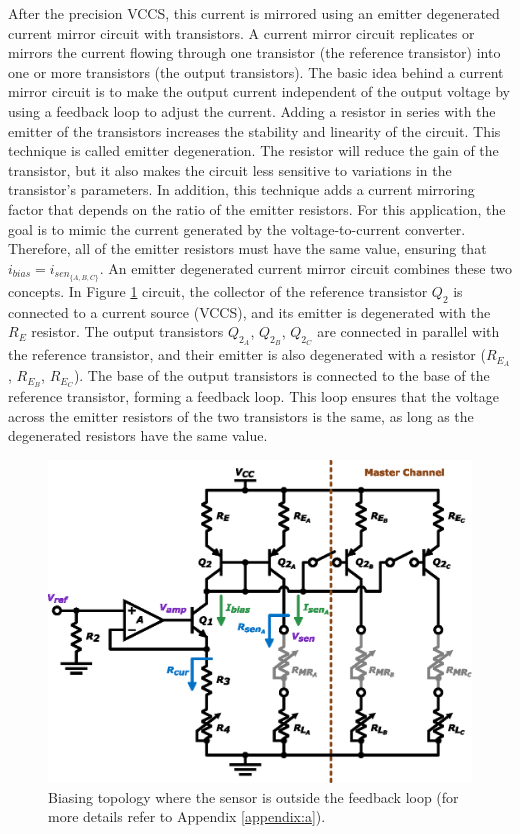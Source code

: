 After the precision \ac{VCCS}, this current is mirrored using an emitter degenerated current mirror circuit with transistors. A current mirror circuit replicates or mirrors the current flowing through one transistor (the reference transistor) into one or more transistors (the output transistors). The basic idea behind a current mirror circuit is to make the output current independent of the output voltage by using a feedback loop to adjust the current. Adding a resistor in series with the emitter of the transistors increases the stability and linearity of the circuit. This technique is called emitter degeneration. The resistor will reduce the gain of the transistor, but it also makes the circuit less sensitive to variations in the transistor's parameters. In addition, this technique adds a current mirroring factor that depends on the ratio of the emitter resistors. For this application, the goal is to mimic the current generated by the voltage-to-current converter. Therefore, all of the emitter resistors must have the same value, ensuring that $i_{bias} = i_{sen_{\{A, B, C\}}}$. An emitter degenerated current mirror circuit combines these two concepts. In Figure \ref{figure:bias-openloop} circuit, the collector of the reference transistor $Q_2$ is connected to a current source (\ac{VCCS}), and its emitter is degenerated with the $R_E$ resistor. The output transistors $Q_{2_{A}}$, $Q_{2_{B}}$, $Q_{2_{C}}$ are connected in parallel with the reference transistor, and their emitter is also degenerated with a resistor ($R_{E_{A}}$, $R_{E_{B}}$, $R_{E_{C}}$). The base of the output transistors is connected to the base of the reference transistor, forming a feedback loop. This loop ensures that the voltage across the emitter resistors of the two transistors is the same, as long as the degenerated resistors have the same value.

\begin{figure}[!ht]
    \centering
    \includegraphics[width=.67\textwidth]{images/chapter_4/channel/bias_openloop.eps}
    \caption{Biasing topology where the sensor is outside the feedback loop (for more details refer to Appendix \ref{appendix:a}).}
    \label{figure:bias-openloop}
\end{figure}

